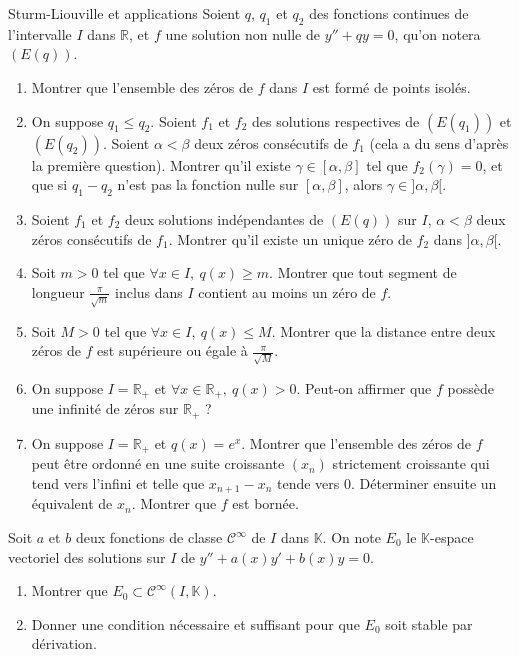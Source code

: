 \documentclass[french,a4paper]{article}
\newcommand{\R}{\mathbb{R}}
\newcommand{\K}{\mathbb{K}}
\theoremstyle{plain}
\theoremstyle{definition}
\theoremstyle{remark}
\begin{document}
\begin{ex}[Châteaux]{Sturm-Liouville et applications}
	Soient $q$, $q_1$ et $q_2$ des fonctions continues de l'intervalle $I$ dans $\R$, et $f$ une solution non nulle de $y''+qy=0$, qu'on notera $(E(q))$.
	\begin{enumerate}
		\item Montrer que l'ensemble des zéros de $f$ dans $I$ est formé de points isolés.
		\item On suppose $q_1\leqslant q_2$. Soient $f_1$ et $f_2$ des solutions respectives de $(E(q_1))$ et $(E(q_2))$. Soient $\alpha<\beta$ deux zéros consécutifs de $f_1$ (cela a du sens d'après la première question). Montrer qu'il existe $\gamma\in[\alpha,\beta]$ tel que $f_2(\gamma)=0$, et que si $q_1-q_2$ n'est pas la fonction nulle sur $[\alpha,\beta]$, alors $\gamma\in]\alpha,\beta[$.
		\item Soient $f_1$ et $f_2$ deux solutions indépendantes de $(E(q))$ sur $I$, $\alpha<\beta$ deux zéros consécutifs de $f_1$. Montrer qu'il existe un unique zéro de $f_2$ dans $]\alpha,\beta[$.
		\item Soit $m>0$ tel que $\forall x\in I,\ q(x)\geqslant m$. Montrer que tout segment de longueur $\displaystyle\frac{\pi}{\sqrt{m}}$ inclus dans $I$ contient au moins un zéro de $f$.
		\item Soit $M>0$ tel que $\forall x\in I,\ q(x)\leqslant M$. Montrer que la distance entre deux zéros de $f$ est supérieure ou égale à $\displaystyle\frac{\pi}{\sqrt{M}}$.
		\item On suppose $I=\R_+$ et $\forall x\in\R_+,\ q(x)>0$. Peut-on affirmer que $f$ possède une infinité de zéros sur $\R_+$ ?
		\item On suppose $I=\R_+$ et $q(x)=e^x$. Montrer que l'ensemble des zéros de $f$ peut être ordonné en une suite croissante $(x_n)$ strictement croissante qui tend vers l'infini et telle que $x_{n+1}-x_n$ tende vers $0$. Déterminer ensuite un équivalent de $x_n$. Montrer que $f$ est bornée.
	\end{enumerate}
\end{ex}

\begin{ex}[Moulin.ED.44]{}
	Soit $a$ et $b$ deux fonctions de classe $\mathcal{C}^\infty$ de $I$ dans $\K$. On note $E_0$ le $\K$-espace vectoriel des solutions sur $I$ de $y''+a(x)y'+b(x)y=0$.
	\begin{enumerate}
		\item Montrer que $E_0\subset\mathcal{C}^\infty(I,\K)$.
		\item Donner une condition nécessaire et suffisant pour que $E_0$ soit stable par dérivation.
	\end{enumerate}
\end{ex}
\end{document}
